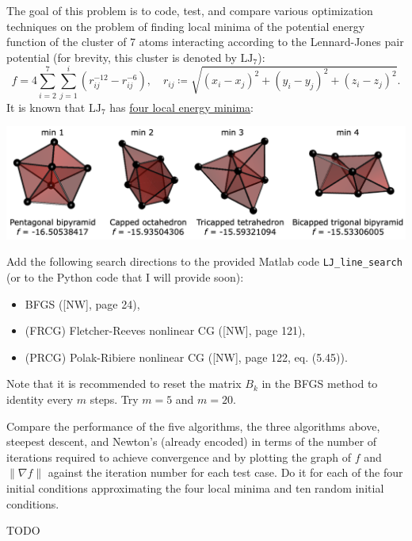 \documentclass{../../../kin_math}
\begin{document}
\begin{questions}
  \question The goal of this problem is to code, test, and compare various optimization techniques on the problem of finding local minima of the potential energy function of the cluster of 7 atoms interacting according to the Lennard-Jones pair potential (for brevity, this cluster is denoted by $\text{LJ}_7$):
  \begin{equation}
    f = 4 \sum_{i = 2}^7 \sum_{j = 1}^i \left(r_{ij}^{-12} - r_{ij}^{-6}\right), \quad r_{ij} \coloneqq \sqrt{(x_i - x_j)^2 + (y_i - y_j)^2 + (z_i - z_j)^2}.
  \end{equation}
  \newpage
  It is known that $\text{LJ}_7$ has \href{https://doi.org/10.1063/1.475008}{four local energy minima}:
  \begin{center}
    \includegraphics[scale=0.2]{minima.png}
  \end{center}
  Add the following search directions to the provided Matlab code \texttt{LJ\_line\_search} (or to the Python code that I will provide soon):
  \begin{itemize}
    \item BFGS ([NW], page 24),
    \item (FRCG) Fletcher-Reeves nonlinear CG ([NW], page 121),
    \item (PRCG) Polak-Ribiere nonlinear CG ([NW], page 122, eq. (5.45)).
  \end{itemize}
  Note that it is recommended to reset the matrix $B_k$ in the BFGS method to identity every $m$ steps. Try $m = 5$ and $m = 20$.

  Compare the performance of the five algorithms, the three algorithms above, steepest descent, and Newton's (already encoded) in terms of the number of iterations required to achieve convergence and by plotting the graph of $f$ and $\lVert \nabla f \rVert$ against the iteration number for each test case. Do it for each of the four initial conditions approximating the four local minima and ten random initial conditions.
  \begin{solution}
    TODO
  \end{solution}


\end{questions}
\end{document}
